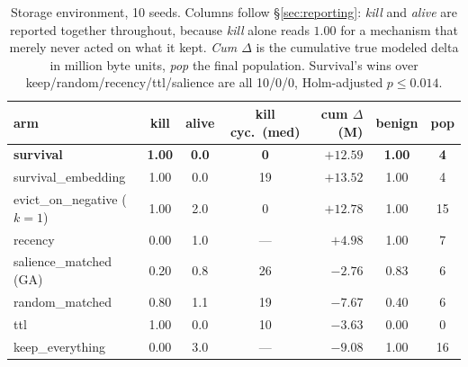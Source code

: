 \begin{table}[t]
\centering
\tabsize
\caption{Storage environment, 10 seeds. Columns follow
\S\ref{sec:reporting}: \emph{kill} and \emph{alive} are reported
together throughout, because \emph{kill} alone reads $1.00$ for a
mechanism that merely never acted on what it kept. \emph{Cum $\Delta$} is
the cumulative true modeled delta in million byte units, \emph{pop} the final population.
Survival's wins over keep/random/recency/ttl/salience are all 10/0/0,
Holm-adjusted $p \le 0.014$.}
\label{tab:headline}
\begin{tabular}{lcccrcc}
\toprule
arm & kill & alive & kill cyc.\ (med) & cum $\Delta$ (M) & benign & pop \\
\midrule
\textbf{survival}        & \textbf{1.00} & \textbf{0.0} & \textbf{0}  & $\mathbf{+12.59}$ & \textbf{1.00} & \textbf{4} \\
survival\_embedding      & 1.00 & 0.0 & 19 & $+13.52$ & 1.00 & 4 \\
evict\_on\_negative ($k{=}1$) & 1.00 & 2.0 & 0  & $+12.78$ & 1.00 & 15 \\
recency                  & 0.00 & 1.0 & --- & $+4.98$  & 1.00 & 7  \\
salience\_matched (GA)   & 0.20 & 0.8 & 26 & $-2.76$  & 0.83 & 6  \\
random\_matched          & 0.80 & 1.1 & 19 & $-7.67$  & 0.40 & 6  \\
ttl                      & 1.00 & 0.0 & 10 & $-3.63$  & 0.00 & 0  \\
keep\_everything         & 0.00 & 3.0 & --- & $-9.08$  & 1.00 & 16 \\
\bottomrule
\end{tabular}
\end{table}

